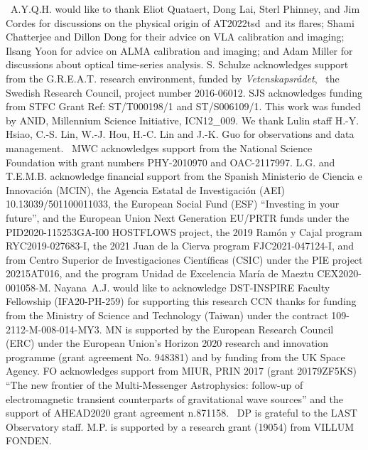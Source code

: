 \documentclass{nature_plusfigure}
\newcommand{\at}{AT2022tsd}
\begin{document}
\begin{addendum}

\item   A.Y.Q.H. would like to thank Eliot Quataert, Dong Lai, Sterl Phinney, and Jim Cordes for discussions on the physical origin of \at\ and its flares; Shami Chatterjee and Dillon Dong for their advice on VLA calibration and imaging; Ilsang Yoon for advice on ALMA calibration and imaging; and Adam Miller for discussions about optical time-series analysis.
S. Schulze acknowledges support from the G.R.E.A.T. research environment, funded by {\em Vetenskapsr\aa det},  the Swedish Research Council, project number 2016-06012.
SJS acknowledges funding from STFC Grant Ref: ST/T000198/1 and ST/S006109/1.
This work was funded by ANID, Millennium Science Initiative, ICN12\_009.
We thank Lulin staff H.-Y. Hsiao, C.-S. Lin, W.-J. Hou, H.-C. Lin and J.-K. Guo for observations and data management. 
MWC acknowledges support from the National Science Foundation with grant numbers PHY-2010970 and OAC-2117997.
L.G. and T.E.M.B. acknowledge financial support from the Spanish Ministerio de Ciencia e Innovaci\'on (MCIN), the Agencia Estatal de Investigaci\'on (AEI) 10.13039/501100011033, the European Social Fund (ESF) ``Investing in your future'', and the European Union Next Generation EU/PRTR funds under the PID2020-115253GA-I00 HOSTFLOWS project, the 2019 Ram\'on y Cajal program RYC2019-027683-I, the 2021 Juan de la Cierva program FJC2021-047124-I, and from Centro Superior de Investigaciones Cient\'ificas (CSIC) under the PIE project 20215AT016, and the program Unidad de Excelencia Mar\'ia de Maeztu CEX2020-001058-M.
Nayana A.J. would like to acknowledge DST-INSPIRE Faculty Fellowship (IFA20-PH-259) for supporting this research
CCN thanks for funding from the Ministry of Science and Technology (Taiwan) under the contract 109-2112-M-008-014-MY3.
MN is supported by the European Research Council (ERC) under the European Union’s Horizon 2020 research and innovation programme (grant agreement No. 948381) and by funding from the UK Space Agency.
FO acknowledges support from MIUR, PRIN 2017 (grant 20179ZF5KS) ``The new frontier of the Multi-Messenger Astrophysics: follow-up of electromagnetic transient counterparts of gravitational wave sources'' and the support of AHEAD2020 grant agreement n.871158. 
DP is grateful to the LAST Observatory staff.
M.P. is supported by a research grant (19054) from VILLUM FONDEN.


\end{addendum}
\end{document}
